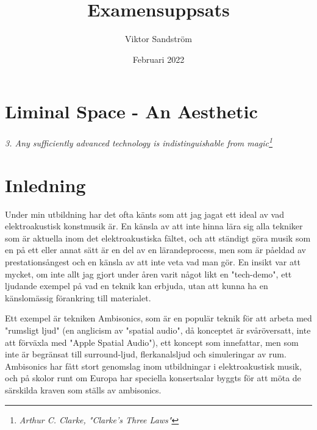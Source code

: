 \documentclass{article}
\begin{document}

\title{Examensuppsats}
\author{Viktor Sandström}
\date{Februari 2022}


\section{Liminal Space - An Aesthetic}

\emph{3. Any sufficiently advanced technology is indistinguishable from magic\footnote{\emph{Arthur C. Clarke, "Clarke's Three Laws"}}}



\section{Inledning}
Under min utbildning har det ofta känts som att jag jagat ett ideal av vad elektroakustisk konstmusik är. En
känsla av att inte hinna lära sig alla tekniker som är aktuella inom det elektroakustiska fältet, och att
ständigt göra musik som en på ett eller annat sätt är en del av en lärandeprocess, men som är påeldad av
prestationsångest och en känsla av att inte veta vad man gör. En insikt var att mycket, om inte allt jag gjort
under åren varit något likt en "tech-demo", ett ljudande exempel på vad en teknik kan erbjuda, utan att kunna
ha en känslomässig förankring till materialet. 

Ett exempel är tekniken Ambisonics, som är en populär teknik för att arbeta med "rumsligt ljud" (en anglicism av "spatial
audio", då konceptet är svåröversatt, inte att förväxla med "Apple Spatial Audio"), ett koncept som
innefattar, men som inte är begränsat till surround-ljud, flerkanalsljud och simuleringar av rum. Ambisonics
har fått stort genomslag inom utbildningar i elektroakustisk musik, och på skolor runt om Europa har speciella
konsertsalar byggts för att möta de särskilda kraven som ställs av ambisonics.
\end{document}
